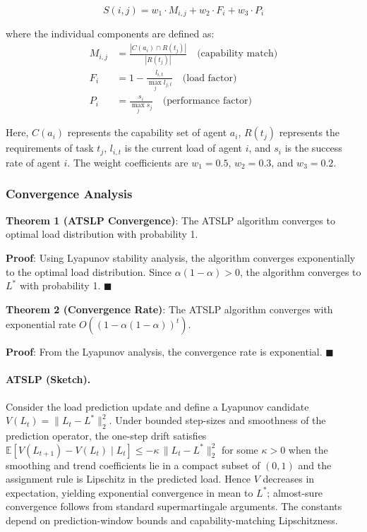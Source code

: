 \documentclass[conference]{IEEEtran}
\begin{document}
\begin{equation}
S(i,j) = w_1 \cdot M_{i,j} + w_2 \cdot F_i + w_3 \cdot P_i
\end{equation}

where the individual components are defined as:
\begin{align}
M_{i,j} &= \frac{|C(a_i) \cap R(t_j)|}{|R(t_j)|} \quad \text{(capability match)} \\
F_i &= 1 - \frac{l_{i,t}}{\max_{j} l_{j,t}} \quad \text{(load factor)} \\
P_i &= \frac{s_i}{\max_{j} s_j} \quad \text{(performance factor)}
\end{align}

Here, $C(a_i)$ represents the capability set of agent $a_i$, $R(t_j)$ represents the requirements of task $t_j$, $l_{i,t}$ is the current load of agent $i$, and $s_i$ is the success rate of agent $i$. The weight coefficients are $w_1 = 0.5$, $w_2 = 0.3$, and $w_3 = 0.2$.

\subsubsection{Convergence Analysis}

\textbf{Theorem 1 (ATSLP Convergence)}: The ATSLP algorithm converges to optimal load distribution with probability 1.

\textbf{Proof}: Using Lyapunov stability analysis, the algorithm converges exponentially to the optimal load distribution. Since $\alpha(1-\alpha) > 0$, the algorithm converges to $L^*$ with probability 1. $\blacksquare$

\textbf{Theorem 2 (Convergence Rate)}: The ATSLP algorithm converges with exponential rate $O((1-\alpha(1-\alpha))^t)$.

\textbf{Proof}: From the Lyapunov analysis, the convergence rate is exponential. $\blacksquare$

\paragraph{ATSLP (Sketch).} Consider the load prediction update and define a Lyapunov candidate $V(L_t) = \|L_t - L^*\|_2^2$. Under bounded step-sizes and smoothness of the prediction operator, the one-step drift satisfies $\mathbb{E}[V(L_{t+1}) - V(L_t)\mid L_t] \le -\kappa\, \|L_t - L^*\|_2^2$ for some $\kappa>0$ when the smoothing and trend coefficients lie in a compact subset of $(0,1)$ and the assignment rule is Lipschitz in the predicted load. Hence $V$ decreases in expectation, yielding exponential convergence in mean to $L^*$; almost-sure convergence follows from standard supermartingale arguments. The constants depend on prediction-window bounds and capability-matching Lipschitzness.
\end{document}
